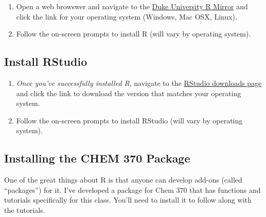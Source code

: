 \documentclass[]{tufte-book}
\providecommand{\tightlist}{%
  \setlength{\itemsep}{0pt}\setlength{\parskip}{0pt}}
\begin{document}
\begin{enumerate}
\def\labelenumi{\arabic{enumi}.}
\tightlist
\item
  Open a web browswer and navigate to the \href{http://archive.linux.duke.edu/cran/}{Duke University R Mirror} and click the link for your operating system (Windows, Mac OSX, Linux).\\
\item
  Follow the on-screen prompts to install R (will vary by operating system).
\end{enumerate}

\hypertarget{install-rstudio}{%
\subsection*{Install RStudio}\label{install-rstudio}}

\begin{enumerate}
\def\labelenumi{\arabic{enumi}.}
\tightlist
\item
  \emph{Once you've successfully installed R}, navigate to the \href{https://rstudio.com/products/rstudio/download/\#download}{RStudio downloads page} and click the link to download the version that matches your operating system.\\
\item
  Follow the on-screen prompts to install RStudio (will vary by operating system).
\end{enumerate}

\hypertarget{installing-c370-package}{%
\subsection*{Installing the CHEM 370 Package}\label{installing-c370-package}}

One of the great things about R is that anyone can develop add-ons (called ``packages'') for it. I've developed a package for Chem 370 that has functions and tutorials specifically for this class. You'll need to install it to follow along with the tutorials.
\end{document}
